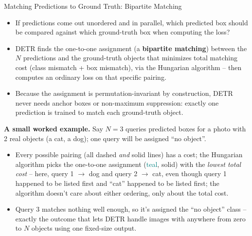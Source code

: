 \begin{vbframe}{Matching Predictions to Ground Truth: Bipartite Matching}
\begin{itemize}
  \item \ques If predictions come out unordered and in parallel, which predicted box should be compared against which ground-truth box when computing the loss?
  \item DETR finds the one-to-one assignment (a \textbf{bipartite matching}) between the $N$ predictions and the ground-truth objects that minimizes total matching cost (class mismatch + box mismatch), via the Hungarian algorithm -- then computes an ordinary loss on that specific pairing.
  \item Because the assignment is permutation-invariant by construction, DETR never needs anchor boxes or non-maximum suppression: exactly one prediction is trained to match each ground-truth object.
\end{itemize}

\framebreak

\textbf{A small worked example.} Say $N=3$ queries predicted boxes for a photo with 2 real objects (a cat, a dog); one query will be assigned ``no object''.

\begin{center}
\end{center}

\begin{itemize}
  \item Every possible pairing (all dashed \emph{and} solid lines) has a cost; the Hungarian algorithm picks the one-to-one assignment (\textcolor{teal}{teal}, solid) with the \emph{lowest total cost} -- here, query 1 $\to$ dog and query 2 $\to$ cat, even though query 1 happened to be listed first and ``cat'' happened to be listed first; the algorithm doesn't care about either ordering, only about the total cost.
  \item Query 3 matches nothing well enough, so it's assigned the ``no object'' class -- exactly the outcome that lets DETR handle images with anywhere from zero to $N$ objects using one fixed-size output.
\end{itemize}
\end{vbframe}


